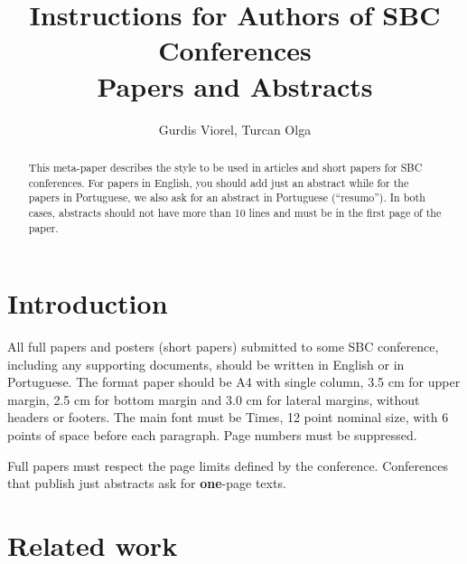 \documentclass[12pt]{article}
\title{Instructions for Authors of SBC Conferences\\ Papers and Abstracts}
\author{Gurdis Viorel, Turcan Olga}
\begin{document}
 

\maketitle

\begin{abstract}
  This meta-paper describes the style to be used in articles and short papers
  for SBC conferences. For papers in English, you should add just an abstract
  while for the papers in Portuguese, we also ask for an abstract in
  Portuguese (``resumo''). In both cases, abstracts should not have more than
  10 lines and must be in the first page of the paper.
\end{abstract}


\section{Introduction}

All full papers and posters (short papers) submitted to some SBC conference,
including any supporting documents, should be written in English or in
Portuguese. The format paper should be A4 with single column, 3.5 cm for upper
margin, 2.5 cm for bottom margin and 3.0 cm for lateral margins, without
headers or footers. The main font must be Times, 12 point nominal size, with 6
points of space before each paragraph. Page numbers must be suppressed.

Full papers must respect the page limits defined by the conference.
Conferences that publish just abstracts ask for \textbf{one}-page texts.

\section{Related work} \label{sec:firstpage}
\end{document}
